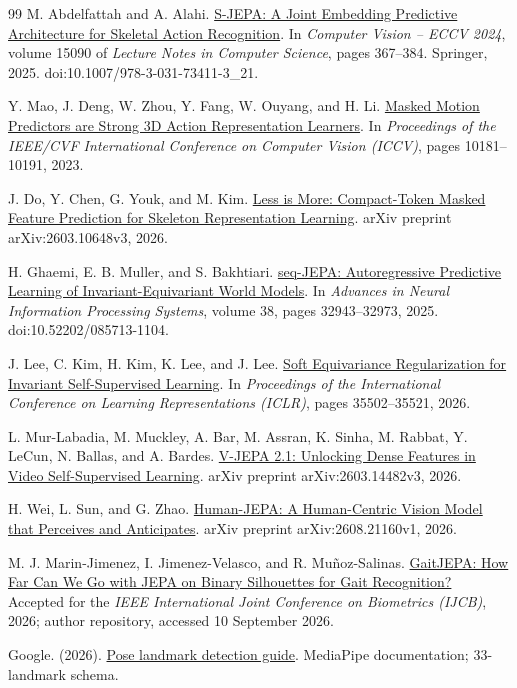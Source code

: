 \documentclass{article}
\begin{document}
{\begin{thebibliography}{99}
 M. Abdelfattah and A. Alahi. \href{https://www.ecva.net/papers/eccv_2024/papers_ECCV/papers/04755.pdf}{S-JEPA: A Joint Embedding Predictive Architecture for Skeletal Action Recognition}. In \emph{Computer Vision -- ECCV 2024}, volume 15090 of \emph{Lecture Notes in Computer Science}, pages 367--384. Springer, 2025. doi:10.1007/978-3-031-73411-3\_21.

 Y. Mao, J. Deng, W. Zhou, Y. Fang, W. Ouyang, and H. Li. \href{https://arxiv.org/abs/2308.07092}{Masked Motion Predictors are Strong 3D Action Representation Learners}. In \emph{Proceedings of the IEEE/CVF International Conference on Computer Vision (ICCV)}, pages 10181--10191, 2023.

 J. Do, Y. Chen, G. Youk, and M. Kim. \href{https://arxiv.org/abs/2603.10648}{Less is More: Compact-Token Masked Feature Prediction for Skeleton Representation Learning}. arXiv preprint arXiv:2603.10648v3, 2026.

 H. Ghaemi, E. B. Muller, and S. Bakhtiari. \href{https://proceedings.neurips.cc/paper_files/paper/2025/hash/2f63d2963526bdd9ff1b8bcc2dc9905a-Abstract-Conference.html}{seq-JEPA: Autoregressive Predictive Learning of Invariant-Equivariant World Models}. In \emph{Advances in Neural Information Processing Systems}, volume 38, pages 32943--32973, 2025. doi:10.52202/085713-1104.

 J. Lee, C. Kim, H. Kim, K. Lee, and J. Lee. \href{https://proceedings.iclr.cc/paper_files/paper/2026/hash/3be6511c8f56d0dca4b5ed59fdf9b2f4-Abstract-Conference.html}{Soft Equivariance Regularization for Invariant Self-Supervised Learning}. In \emph{Proceedings of the International Conference on Learning Representations (ICLR)}, pages 35502--35521, 2026.

 L. Mur-Labadia, M. Muckley, A. Bar, M. Assran, K. Sinha, M. Rabbat, Y. LeCun, N. Ballas, and A. Bardes. \href{https://arxiv.org/abs/2603.14482}{V-JEPA 2.1: Unlocking Dense Features in Video Self-Supervised Learning}. arXiv preprint arXiv:2603.14482v3, 2026.

 H. Wei, L. Sun, and G. Zhao. \href{https://arxiv.org/abs/2608.21160}{Human-JEPA: A Human-Centric Vision Model that Perceives and Anticipates}. arXiv preprint arXiv:2608.21160v1, 2026.

 M. J. Marin-Jimenez, I. Jimenez-Velasco, and R. Muñoz-Salinas. \href{https://github.com/AVAuco/GaitJEPA}{GaitJEPA: How Far Can We Go with JEPA on Binary Silhouettes for Gait Recognition?} Accepted for the \emph{IEEE International Joint Conference on Biometrics (IJCB)}, 2026; author repository, accessed 10 September 2026.

 Google. (2026). \href{https://developers.google.com/edge/mediapipe/solutions/vision/pose_landmarker}{Pose landmark detection guide}. MediaPipe documentation; 33-landmark schema.
\end{thebibliography}
}
\clearpage
\appendix
\label{physworld:appendix-start}
\end{document}
